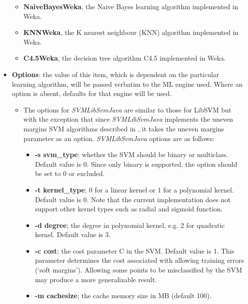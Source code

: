 \begin{itemize}
\begin{itemize}
\item {\bf NaiveBayesWeka}, the Naive Bayes learning algorithm implemented in
Weka.

\item {\bf KNNWeka}, the K nearest neighbour (KNN) algorithm implemented in
Weka.

\item {\bf C4.5Weka}, the decision tree algorithm C4.5 implemented in Weka.

\end{itemize}

\item \textbf{Options}: the value of this item, which is dependent on the
particular learning algorithm, will be passed verbatim to the ML engine used.
Where an option is absent, defaults for that engine will be used.

\begin{itemize}
  
\item The options for {\em SVMLibSvmJava} are similar to those for
LibSVM but with the exception that since {\em
SVMLibSvmJava} implements the uneven margins SVM algorithms described in
\cite{Yaoyong03}, it takes the uneven margins parameter as an option.
{\em SVMLibSvmJava} options are as follows:

\begin{itemize}
  
\item {\bf -s svm\_type}; whether the SVM should be binary or multiclass.
Default value is 0. Since only binary is supported, the option should be set to
0 or excluded.

\item {\bf -t kernel\_type}; 0 for a linear kernel or 1 for a polynomial kernel.
Default value is 0. Note that the current implementation does not support other kernel 
types such as radial and sigmoid function.

\item {\bf -d degree}; the degree in polynomial kernel, e.g. 2 for quadratic
kernel. Default value is 3.

\item {\bf -c cost}; the cost parameter C in the SVM. Default value is 1. This
parameter determines the cost associated with allowing training errors (`soft
margins'). Allowing some points to be misclassified by the SVM may produce a
more generalizable result.

\item {\bf -m cachesize}; the cache memory size in MB (default 100).


\end{itemize}
\end{itemize}
\end{itemize}
